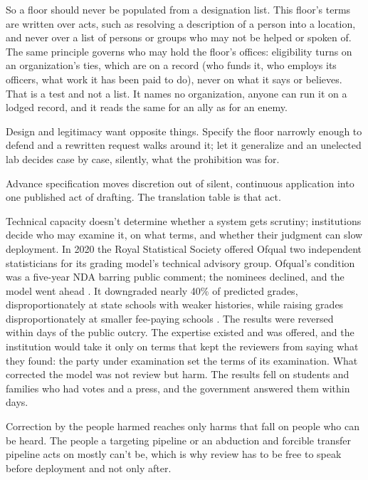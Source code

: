 So a floor should never be populated from a designation list.
This floor's terms are written over acts, such as resolving a description of a person into a location, and never over a list of persons or groups who may not be helped or spoken of.
The same principle governs who may hold the floor's offices: eligibility turns on an organization's ties, which are on a record (who funds it, who employs its officers, what work it has been paid to do), never on what it says or believes. That is a test and not a list. It names no organization, anyone can run it on a lodged record, and it reads the same for an ally as for an enemy.


Design and legitimacy want opposite things. Specify the floor narrowly enough to defend and a rewritten request walks around it; let it generalize and an unelected lab decides case by case, silently, what the prohibition was for.

Advance specification moves discretion out of silent, continuous application into one published act of drafting. The translation table is that act.

Technical capacity doesn't determine whether a system gets scrutiny; institutions decide who may examine it, on what terms, and whether their judgment can slow deployment. In 2020 the Royal Statistical Society offered Ofqual two independent statisticians for its grading model's technical advisory group. Ofqual's condition was a five-year NDA barring public comment; the nominees declined, and the model went ahead \autocite{rss2020ofqual}. It downgraded nearly 40\% of predicted grades, disproportionately at state schools with weaker histories, while raising grades disproportionately at smaller fee-paying schools \autocite{cnbc2020ofqual}. The results were reversed within days of the public outcry. The expertise existed and was offered, and the institution would take it only on terms that kept the reviewers from saying what they found: the party under examination set the terms of its examination. What corrected the model was not review but harm. The results fell on students and families who had votes and a press, and the government answered them within days.

Correction by the people harmed reaches only harms that fall on people who can be heard. The people a targeting pipeline or an abduction and forcible transfer pipeline acts on mostly can't be, which is why review has to be free to speak before deployment and not only after.
